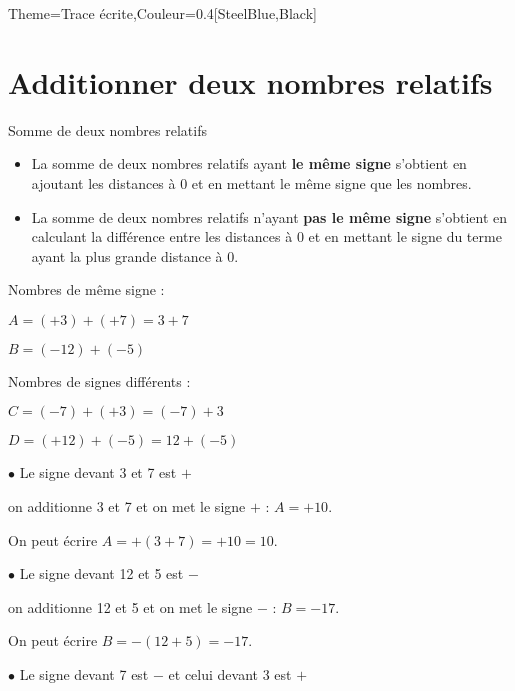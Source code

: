 \begin{Maquette}[Cours]{Theme={Trace écrite},Couleur={0.4[SteelBlue,Black]}}

   \section{Additionner deux nombres relatifs}

      \begin{methode*}{Somme de deux nombres relatifs}
         \begin{itemize}
            \item La somme de deux nombres relatifs ayant {\bf le même signe} s'obtient en ajoutant les distances à 0 et en mettant le même signe que les nombres. 
            \item La somme de deux nombres relatifs n'ayant {\bf pas le même signe} s'obtient en calculant la différence entre les distances à 0 et en mettant le signe du terme ayant la plus grande distance à 0.
         \end{itemize}
         \begin{exbmethode}
            \begin{multicols}{2}
               Nombres de même signe : \par
               $A =(+3)+(+7) = 3+7$ \par
               $B =(-12)+(-5)$ \par
               Nombres de signes différents : \par
               $C =(-7)+(+3) =(-7)+3$ \par
               $D =(+12)+(-5) =12+(-5)$
            \end{multicols}
            \tcblower
               \begin{multicols}{2}
                  $\bullet$ Le signe devant 3 et 7 est $+$ \par
                  on additionne 3 et 7 et on met le signe $+$ : $A =+10$. \par
                  On peut écrire $A =+(3+7) =+10 =10$. \par
                  $\bullet$ Le signe devant 12 et 5 est $-$ \par
                  on additionne 12 et 5 et on met le signe $-$ : $B =-17$. \par
                  On peut écrire $B =-(12+5) =-17$. \par
                  $\bullet$ Le signe devant 7 est $-$ et celui devant 3 est $+$ \par

\end{multicols}
\end{exbmethode}
\end{methode*}
\end{Maquette}
